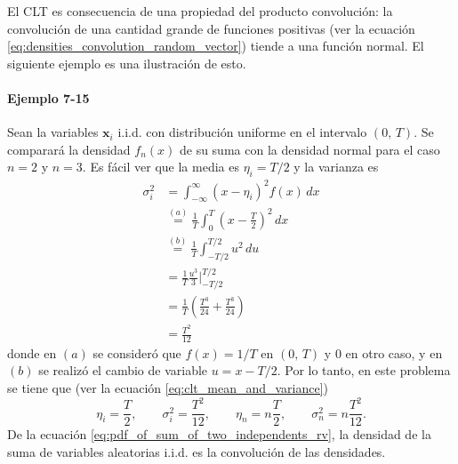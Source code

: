 \documentclass[a4paper]{report}
\newcommand{\x}{\mathbf{x}}
\begin{document}
El CLT es consecuencia de una propiedad del producto convolución: la convolución de una cantidad grande de funciones positivas (ver la ecuación \ref{eq:densities_convolution_random_vector}) tiende a una función normal. El siguiente ejemplo es una ilustración de esto.

\paragraph{Ejemplo 7-15}\label{sec:example_7_15} Sean la variables \(\x_i\) i.i.d. con distribución uniforme en el intervalo \((0,\,T)\). Se comparará la densidad \(f_n(x)\) de su suma con la densidad normal para el caso \(n=2\) y \(n=3\). Es fácil ver que la media es \(\eta_i=T/2\) y la varianza es
\begin{align*}
 \sigma^2_i&=\int_{-\infty}^\infty(x-\eta_i)^2f(x)\,dx\\
  &\overset{(a)}{=}\frac{1}{T}\int_{0}^{T}\left(x-\frac{T}{2}\right)^2\,dx\\
  &\overset{(b)}{=}\frac{1}{T}\int_{-T/2}^{T/2}u^2\,du\\
  &=\frac{1}{T}\frac{u^3}{3}\bigg|_{-T/2}^{T/2}\\
  &=\frac{1}{T}\left(\frac{T^3}{24}+\frac{T^3}{24}\right)\\
  &=\frac{T^2}{12}
\end{align*}
donde en \((a)\) se consideró que \(f(x)=1/T\) en \((0,\,T)\) y 0 en otro caso, y en \((b)\) se realizó el cambio de variable \(u=x-T/2\). Por lo tanto, en este problema se tiene que (ver la ecuación \ref{eq:clt_mean_and_variance})
\[
 \eta_i=\frac{T}{2},\qquad\sigma_i^2=\frac{T^2}{12},\qquad\eta_n=n\frac{T}{2},\qquad\sigma_n^2=n\frac{T^2}{12}.
\]
De la ecuación \ref{eq:pdf_of_sum_of_two_independents_rv}, la densidad de la suma de variables aleatorias i.i.d. es la convolución de las densidades.
\end{document}
